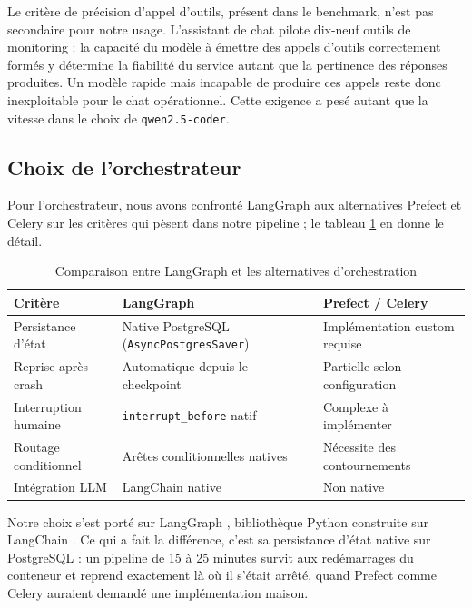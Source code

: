         Le critère de précision d'appel d'outils, présent dans le benchmark, n'est pas
        secondaire pour notre usage. L'assistant de chat pilote dix-neuf outils de
        monitoring : la capacité du modèle à émettre des appels d'outils correctement
        formés y détermine la fiabilité du service autant que la pertinence des réponses
        produites. Un modèle rapide mais incapable de produire ces appels reste donc
        inexploitable pour le chat opérationnel. Cette exigence a pesé autant que la
        vitesse dans le choix de \texttt{qwen2.\allowbreak{}5-coder}.

    \subsection{Choix de l'orchestrateur}

        Pour l'orchestrateur, nous avons confronté LangGraph aux alternatives Prefect et
        Celery sur les critères qui pèsent dans notre pipeline ; le tableau
        \ref{tab:langgraph_comp} en donne le détail.

        \begin{table}[H]
        \centering
        \begin{tabular}{|m{3.5cm}|m{5cm}|m{5cm}|}
        \hline
        \textbf{Critère} & \textbf{LangGraph} & \textbf{Prefect / Celery} \\
        \hline
        Persistance d'état & Native PostgreSQL (\texttt{AsyncPostgresSaver}) & Implémentation custom requise \\
        \hline
        Reprise après crash & Automatique depuis le checkpoint & Partielle selon configuration \\
        \hline
        Interruption humaine & \texttt{interrupt\_\allowbreak{}before} natif & Complexe à implémenter \\
        \hline
        Routage conditionnel & Arêtes conditionnelles natives & Nécessite des contournements \\
        \hline
        Intégration LLM & LangChain native & Non native \\
        \hline
        \end{tabular}
        \caption{Comparaison entre LangGraph et les alternatives d'orchestration}
        \label{tab:langgraph_comp}
        \end{table}

        Notre choix s'est porté sur LangGraph \cite{LangGraph}, bibliothèque Python
        construite sur LangChain \cite{LangChain}. Ce qui a fait la différence, c'est sa
        persistance d'état native sur PostgreSQL : un pipeline de 15 à 25 minutes survit
        aux redémarrages du conteneur et reprend exactement là où il s'était arrêté, quand
        Prefect comme Celery auraient demandé une implémentation maison.

